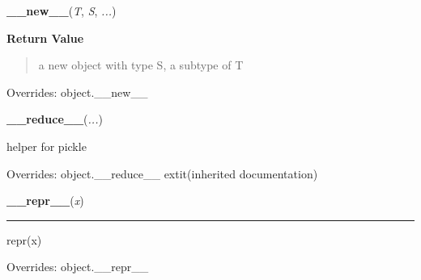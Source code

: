\hspace{.8\funcindent}\begin{boxedminipage}{\funcwidth}

    \raggedright \textbf{\_\_new\_\_}(\textit{T}, \textit{S}, \textit{...})

\setlength{\parskip}{2ex}
\setlength{\parskip}{1ex}
      \textbf{Return Value}
    \vspace{-1ex}

      \begin{quote}
      a new object with type S, a subtype of T

      \end{quote}

      Overrides: object.\_\_new\_\_

    \end{boxedminipage}

    \vspace{0.5ex}

\hspace{.8\funcindent}\begin{boxedminipage}{\funcwidth}

    \raggedright \textbf{\_\_reduce\_\_}(\textit{...})

\setlength{\parskip}{2ex}
    helper for pickle

\setlength{\parskip}{1ex}
      Overrides: object.\_\_reduce\_\_ 	extit{(inherited documentation)}

    \end{boxedminipage}

    \vspace{0.5ex}

\hspace{.8\funcindent}\begin{boxedminipage}{\funcwidth}

    \raggedright \textbf{\_\_repr\_\_}(\textit{x})

    \vspace{-1.5ex}

    \rule{\textwidth}{0.5\fboxrule}
\setlength{\parskip}{2ex}
    repr(x)

\setlength{\parskip}{1ex}
      Overrides: object.\_\_repr\_\_

    \end{boxedminipage}

    \label{time:struct_time:__rmul__}

    \vspace{0.5ex}

